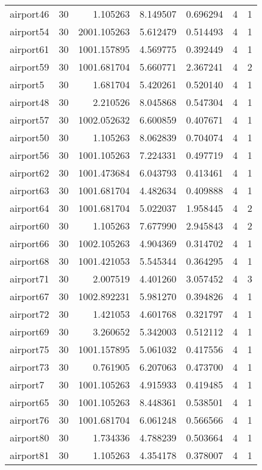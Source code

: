 \begin{longtable}{|l|r|r|r|r|r|r|}
airport46 & 30 & 1.105263 & 8.149507 & 0.696294 & 4 & 1 \\
airport54 & 30 & 2001.105263 & 5.612479 & 0.514493 & 4 & 1 \\
airport61 & 30 & 1001.157895 & 4.569775 & 0.392449 & 4 & 1 \\
airport59 & 30 & 1001.681704 & 5.660771 & 2.367241 & 4 & 2 \\
airport5 & 30 & 1.681704 & 5.420261 & 0.520140 & 4 & 1 \\
airport48 & 30 & 2.210526 & 8.045868 & 0.547304 & 4 & 1 \\
airport57 & 30 & 1002.052632 & 6.600859 & 0.407671 & 4 & 1 \\
airport50 & 30 & 1.105263 & 8.062839 & 0.704074 & 4 & 1 \\
airport56 & 30 & 1001.105263 & 7.224331 & 0.497719 & 4 & 1 \\
airport62 & 30 & 1001.473684 & 6.043793 & 0.413461 & 4 & 1 \\
airport63 & 30 & 1001.681704 & 4.482634 & 0.409888 & 4 & 1 \\
airport64 & 30 & 1001.681704 & 5.022037 & 1.958445 & 4 & 2 \\
airport60 & 30 & 1.105263 & 7.677990 & 2.945843 & 4 & 2 \\
airport66 & 30 & 1002.105263 & 4.904369 & 0.314702 & 4 & 1 \\
airport68 & 30 & 1001.421053 & 5.545344 & 0.364295 & 4 & 1 \\
airport71 & 30 & 2.007519 & 4.401260 & 3.057452 & 4 & 3 \\
airport67 & 30 & 1002.892231 & 5.981270 & 0.394826 & 4 & 1 \\
airport72 & 30 & 1.421053 & 4.601768 & 0.321797 & 4 & 1 \\
airport69 & 30 & 3.260652 & 5.342003 & 0.512112 & 4 & 1 \\
airport75 & 30 & 1001.157895 & 5.061032 & 0.417556 & 4 & 1 \\
airport73 & 30 & 0.761905 & 6.207063 & 0.473700 & 4 & 1 \\
airport7 & 30 & 1001.105263 & 4.915933 & 0.419485 & 4 & 1 \\
airport65 & 30 & 1001.105263 & 8.448361 & 0.538501 & 4 & 1 \\
airport76 & 30 & 1001.681704 & 6.061248 & 0.566566 & 4 & 1 \\
airport80 & 30 & 1.734336 & 4.788239 & 0.503664 & 4 & 1 \\
airport81 & 30 & 1.105263 & 4.354178 & 0.378007 & 4 & 1 \\

\end{longtable}
